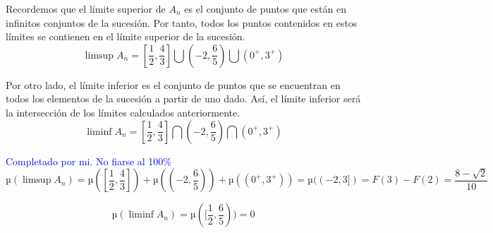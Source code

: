 \begin{problem}
Recordemos que el límite superior de $A_n$ es el conjunto de puntos que están en infinitos conjuntos de la sucesión. Por tanto, todos los puntos contenidos en estos límites se contienen en el límite superior de la sucesión.
\[\limsup A_n = [\frac{1}{2}, \frac{4}{3}] \bigcup  (-2, \frac{6}{5}) \bigcup (0^+, 3^+)\]

Por otro lado, el límite inferior es el conjunto de puntos que se encuentran en todos los elementos de la sucesión a partir de uno dado. Así, el límite inferior será la intersección de los límites calculados anteriormente.
\[\liminf A_n = [\frac{1}{2}, \frac{4}{3}] \bigcap  (-2, \frac{6}{5}) \bigcap (0^+, 3^+)\]

\textcolor{blue}{Completado por mi. No fiarse al 100\%}
\[µ(\limsup A_n) = µ([\frac{1}{2}, \frac{4}{3}]) +  µ((-2, \frac{6}{5})) +µ((0^+, 3^+)) = µ((-2, 3]) = F(3) - F(2) = \frac{8-\sqrt{2}}{10}\]

\[µ(\liminf A_n) = µ([\frac{1}{2}, \frac{6}{5})) = 0\]

\end{problem}

